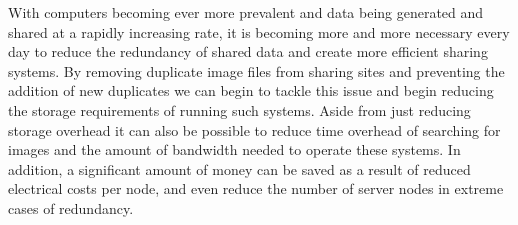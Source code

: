 \documentclass[11pt]{article}
\begin{document}
With computers becoming ever more prevalent and data being generated and shared at a rapidly increasing rate, it is becoming more and more necessary every day to reduce the redundancy of shared data and create more efficient sharing systems. By removing duplicate image files from
sharing sites and preventing the addition of new duplicates we can begin to tackle this issue and begin reducing the storage requirements of running such systems. Aside from just reducing storage overhead it can also be possible to reduce time overhead of searching for images and the amount of bandwidth needed to operate these systems. In addition, a significant amount of money can be saved as a result of reduced electrical costs per node, and even reduce the number of server nodes in extreme cases of redundancy.

\newpage


\end{document}
